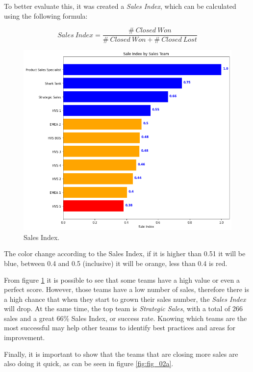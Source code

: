 \documentclass[]{report}
\begin{document}
To better evaluate this, it was created a \textit{Sales Index}, which can be calculated using the following formula:

\begin{equation}
	Sales\:Index = \frac{\#\:Closed\:Won}{\#\:Closed\:Won + \#\:Closed\:Lost}
\end{equation}

\begin{figure}[htb]
	\centering
	\includegraphics[width=1\textwidth]{fig_02_sales_index}
	\caption{Sales Index.}
	\label{fig:fig_02}
\end{figure}

The color change according to the Sales Index, if it is higher than 0.51 it will be blue, between 0.4 and 0.5 (inclusive) it will be orange, less than 0.4 is red.

From figure \textcolor{blue}{\ref{fig:fig_02}} it is possible to see that some teams have a high value or even a perfect score. However, those teams have a low number of sales, therefore there is a high chance that when they start to grown their sales number, the \textit{Sales Index} will drop. At the same time, the top team is \textit{Strategic Sales}, with a total of 266 sales and a great 66\% Sales Index, or success rate. Knowing which teams are the most successful may help other teams to identify best practices and areas for improvement.

Finally, it is important to show that the teams that are closing more sales are also doing it quick, as can be seen in figure \textcolor{blue}{\ref{fig:fig_02a}}. 
\end{document}
